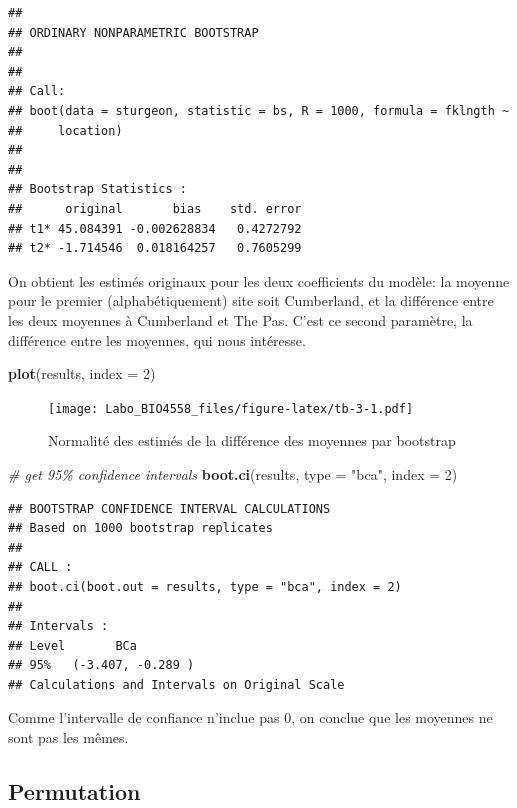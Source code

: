 \documentclass[
  12pt,
]{book}
\newenvironment{Shaded}{\begin{snugshade}}{\end{snugshade}}
\newcommand{\CommentTok}[1]{\textcolor[rgb]{0.56,0.35,0.01}{\textit{#1}}}
\newcommand{\DataTypeTok}[1]{\textcolor[rgb]{0.13,0.29,0.53}{#1}}
\newcommand{\DecValTok}[1]{\textcolor[rgb]{0.00,0.00,0.81}{#1}}
\newcommand{\KeywordTok}[1]{\textcolor[rgb]{0.13,0.29,0.53}{\textbf{#1}}}
\newcommand{\NormalTok}[1]{#1}
\newcommand{\StringTok}[1]{\textcolor[rgb]{0.31,0.60,0.02}{#1}}
\begin{document}
\begin{verbatim}
## 
## ORDINARY NONPARAMETRIC BOOTSTRAP
## 
## 
## Call:
## boot(data = sturgeon, statistic = bs, R = 1000, formula = fklngth ~ 
##     location)
## 
## 
## Bootstrap Statistics :
##      original       bias    std. error
## t1* 45.084391 -0.002628834   0.4272792
## t2* -1.714546  0.018164257   0.7605299
\end{verbatim}

On obtient les estimés originaux pour les deux coefficients du modèle: la moyenne pour le premier (alphabétiquement) site soit Cumberland, et la différence entre les deux moyennes à Cumberland et The Pas. C'est ce second paramètre, la différence entre les moyennes, qui nous intéresse.

\begin{Shaded}
\begin{Highlighting}[]
\KeywordTok{plot}\NormalTok{(results, }\DataTypeTok{index =} \DecValTok{2}\NormalTok{)}
\end{Highlighting}
\end{Shaded}

\begin{figure}
\centering
\texttt{[image: Labo\_BIO4558\_files/figure-latex/tb-3-1.pdf]}
\caption{\label{fig:tb-3}Normalité des estimés de la différence des moyennes par bootstrap}
\end{figure}

\begin{Shaded}
\begin{Highlighting}[]
\CommentTok{\# get 95\% confidence intervals}
\KeywordTok{boot.ci}\NormalTok{(results, }\DataTypeTok{type =} \StringTok{"bca"}\NormalTok{, }\DataTypeTok{index =} \DecValTok{2}\NormalTok{)}
\end{Highlighting}
\end{Shaded}

\begin{verbatim}
## BOOTSTRAP CONFIDENCE INTERVAL CALCULATIONS
## Based on 1000 bootstrap replicates
## 
## CALL : 
## boot.ci(boot.out = results, type = "bca", index = 2)
## 
## Intervals : 
## Level       BCa          
## 95%   (-3.407, -0.289 )  
## Calculations and Intervals on Original Scale
\end{verbatim}

Comme l'intervalle de confiance n'inclue pas 0, on conclue que les moyennes ne sont pas les mêmes.

\hypertarget{permutation}{%
\subsection{Permutation}\label{permutation}}
\end{document}
